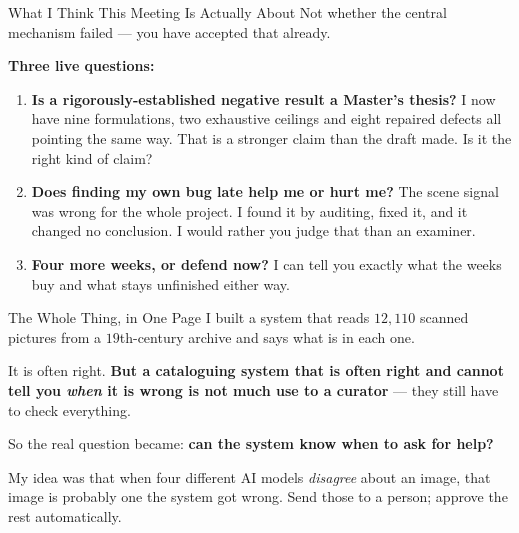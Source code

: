 \documentclass[aspectratio=169,11pt]{beamer}
\begin{document}
\begin{frame}{What I Think This Meeting Is Actually About}
\normalsize
Not whether the central mechanism failed --- you have accepted that already.
\vspace{4mm}

\large\textbf{Three live questions:}
\vspace{2mm}

\normalsize
\begin{enumerate}
  \setlength\itemsep{2.5mm}
  \item \textbf{Is a rigorously-established negative result a Master's thesis?} I now have nine formulations, two exhaustive ceilings and eight repaired defects all pointing the same way. That is a stronger claim than the draft made. Is it the right kind of claim?
  \item \textbf{Does finding my own bug late help me or hurt me?} The scene signal was wrong for the whole project. I found it by auditing, fixed it, and it changed no conclusion. I would rather you judge that than an examiner.
  \item \textbf{Four more weeks, or defend now?} I can tell you exactly what the weeks buy and what stays unfinished either way.
\end{enumerate}
\end{frame}


\begin{frame}{The Whole Thing, in One Page}
\large
I built a system that reads $12{,}110$ scanned pictures from a $19$th-century archive and says what is in each one.
\vspace{4mm}

It is often right. \textbf{But a cataloguing system that is often right and cannot tell you \emph{when} it is wrong is not much use to a curator} --- they still have to check everything.
\vspace{4mm}

So the real question became: \textbf{can the system know when to ask for help?}
\vspace{5mm}

\normalsize My idea was that when four different AI models \emph{disagree} about an image, that image is probably one the system got wrong. Send those to a person; approve the rest automatically.
\end{frame}
\end{document}
